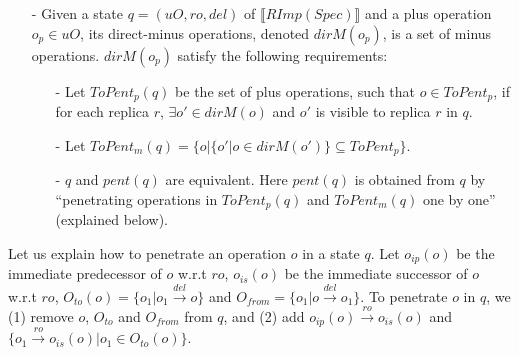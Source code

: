 {\begin{itemize}
\item[-] Given a state $q = (uO,ro,del)$ of $\llbracket RImp(Spec) \rrbracket$ and a plus operation $o_p \in uO$, its direct-minus operations, denoted $dirM(o_p)$, is a set of minus operations. $dirM(o_p)$ satisfy the following requirements:

    \begin{itemize}
    \setlength{\itemsep}{0.5pt}
    \item[-] Let $ToPent_p(q)$ be the set of plus operations, such that $o \in ToPent_p$, if for each replica $r$, $\exists o' \in dirM(o)$ and $o'$ is visible to replica $r$ in $q$.

    \item[-] Let $ToPent_m(q) = \{ o \vert  \{ o' \vert o \in dirM(o') \} \subseteq ToPent_p \}$.

    \item[-] $q$ and $pent(q)$ are equivalent. Here $pent(q)$ is obtained from $q$ by ``penetrating operations in $ToPent_p(q)$ and $ToPent_m(q)$ one by one'' (explained below).
    \end{itemize}
\end{itemize}

Let us explain how to penetrate an operation $o$ in a state $q$. Let $o_{ip}(o)$ be the immediate predecessor of $o$ w.r.t $ro$, $o_{is}(o)$ be the immediate successor of $o$ w.r.t $ro$, $O_{to}(o) = \{o_1 \vert o_1 {\xrightarrow{ del }} o \}$ and $O_{from} = \{o_1 \vert o {\xrightarrow{ del }} o_1 \}$. To penetrate $o$ in $q$, we (1) remove $o$, $O_{to}$ and $O_{from}$ from $q$, and (2) add $o_{ip}(o) {\xrightarrow{ ro }} o_{is}(o)$ and $\{ o_1 {\xrightarrow{ ro }} o_{is}(o) \vert o_1 \in O_{to}(o)\}$.

}
